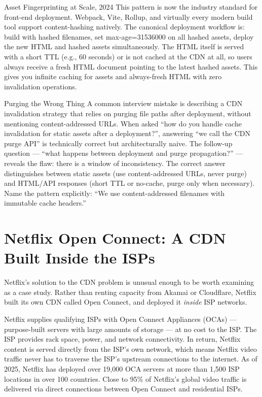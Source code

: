 \documentclass[11pt,a4paper]{article}
\begin{document}
\begin{industrybox}{Asset Fingerprinting at Scale, 2024}
This pattern is now the industry standard for front-end deployment. Webpack, Vite, Rollup, and virtually every modern build tool support content-hashing natively. The canonical deployment workflow is: build with hashed filenames, set max-age=31536000 on all hashed assets, deploy the new HTML and hashed assets simultaneously. The HTML itself is served with a short TTL (e.g., 60 seconds) or is not cached at the CDN at all, so users always receive a fresh HTML document pointing to the latest hashed assets. This gives you infinite caching for assets and always-fresh HTML with zero invalidation operations.
\end{industrybox}

\begin{trapbox}{Purging the Wrong Thing}
A common interview mistake is describing a CDN invalidation strategy that relies on purging file paths after deployment, without mentioning content-addressed URLs. When asked ``how do you handle cache invalidation for static assets after a deployment?'', answering ``we call the CDN purge API'' is technically correct but architecturally naive. The follow-up question --- ``what happens between deployment and purge propagation?'' --- reveals the flaw: there is a window of inconsistency. The correct answer distinguishes between static assets (use content-addressed URLs, never purge) and HTML/API responses (short TTL or no-cache, purge only when necessary). Name the pattern explicitly: ``We use content-addressed filenames with immutable cache headers.''
\end{trapbox}

\section{Netflix Open Connect: A CDN Built Inside the ISPs}

Netflix's solution to the CDN problem is unusual enough to be worth examining as a case study. Rather than renting capacity from Akamai or Cloudflare, Netflix built its own CDN called Open Connect, and deployed it \textit{inside} ISP networks.

Netflix supplies qualifying ISPs with Open Connect Appliances (OCAs) --- purpose-built servers with large amounts of storage --- at no cost to the ISP. The ISP provides rack space, power, and network connectivity. In return, Netflix content is served directly from the ISP's own network, which means Netflix video traffic never has to traverse the ISP's upstream connections to the internet. As of 2025, Netflix has deployed over 19,000 OCA servers at more than 1,500 ISP locations in over 100 countries. Close to 95\% of Netflix's global video traffic is delivered via direct connections between Open Connect and residential ISPs.
\end{document}
